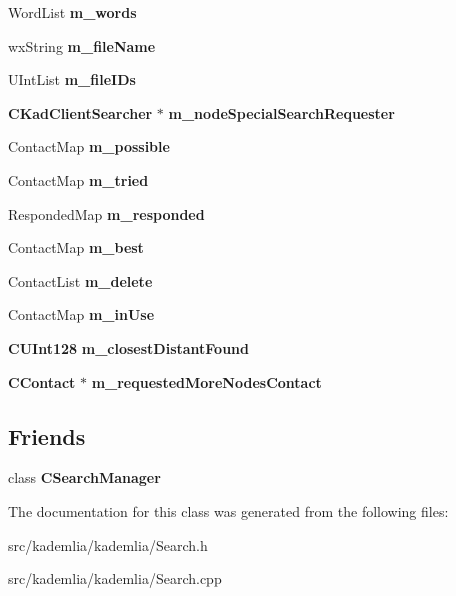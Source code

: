 \begin{DoxyCompactItemize}
\item 
WordList {\bfseries m\_\-words}\label{classKademlia_1_1CSearch_af985d028879ed6243f4c0796c2ff83ac}

\item 
wxString {\bfseries m\_\-fileName}\label{classKademlia_1_1CSearch_a61d1cf24387ef6a2e61e48c02e25abc3}

\item 
UIntList {\bfseries m\_\-fileIDs}\label{classKademlia_1_1CSearch_a74e834eb6a3e55c0abfa5214eed6b6ee}

\item 
{\bf CKadClientSearcher} $\ast$ {\bfseries m\_\-nodeSpecialSearchRequester}\label{classKademlia_1_1CSearch_ae3f47402e51aedf7449ad9113a41220e}

\item 
ContactMap {\bfseries m\_\-possible}\label{classKademlia_1_1CSearch_a4bce0677747a2faee1c28cba117fa877}

\item 
ContactMap {\bfseries m\_\-tried}\label{classKademlia_1_1CSearch_a28a6bf330b73bca21dbcac62cfa5b658}

\item 
RespondedMap {\bfseries m\_\-responded}\label{classKademlia_1_1CSearch_a79f2589a5f5e460dafcbd47e60b8464a}

\item 
ContactMap {\bfseries m\_\-best}\label{classKademlia_1_1CSearch_a45d7bf9ca3afa6b24988c1e5bd10f2e9}

\item 
ContactList {\bfseries m\_\-delete}\label{classKademlia_1_1CSearch_a96cb124ad135bb583155e3a542fa4c01}

\item 
ContactMap {\bfseries m\_\-inUse}\label{classKademlia_1_1CSearch_aa1b4283ce70e10120e784b5575d41444}

\item 
{\bf CUInt128} {\bfseries m\_\-closestDistantFound}\label{classKademlia_1_1CSearch_ab28e6efd7cb0c5c1eedbf71de2691246}

\item 
{\bf CContact} $\ast$ {\bfseries m\_\-requestedMoreNodesContact}\label{classKademlia_1_1CSearch_ad06cef46aecd5f7132c40cec27d77930}

\end{DoxyCompactItemize}
\subsection*{Friends}
\begin{DoxyCompactItemize}
\item 
class {\bfseries CSearchManager}\label{classKademlia_1_1CSearch_a045377c2857a68ea782b0ac776d24e5f}

\end{DoxyCompactItemize}


The documentation for this class was generated from the following files:\begin{DoxyCompactItemize}
\item 
src/kademlia/kademlia/Search.h\item 
src/kademlia/kademlia/Search.cpp\end{DoxyCompactItemize}
